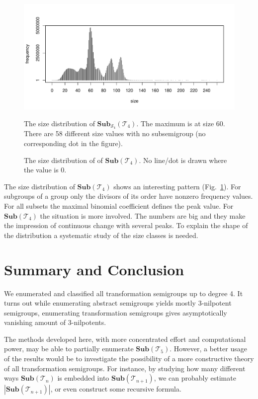\documentclass{amsart}
\newcommand{\cT}{{\mathcal T}}
\newcommand{\cS}{{\mathcal S}}
\newcommand{\Sub}{\mathbf{Sub}}
\theoremstyle{plain}
\theoremstyle{definition}
\begin{document}
\begin{figure}
\includegraphics[width=\textwidth]{SubT4distrib}
\caption{The size distribution of $\Sub_{\cS_4}(\cT_4)$. The maximum is at size 60. There are 58 different size values with no subsemigroup (no corresponding dot in the figure).}
\caption{The size distribution of of $\Sub(\cT_4)$. No line/dot is drawn where the value is 0.}
\label{fig:SubT4SizeDistrib}
\end{figure}
The size distribution of $\Sub(\cT_4)$ shows an interesting pattern (Fig.\ \ref{fig:SubT4SizeDistrib}).
For subgroups of a group only the divisors of its order have nonzero frequency values.
For all subsets the maximal binomial coefficient defines the peak value.
For $\Sub(\cT_4)$ the situation is more involved.
The numbers are big and they make the impression of continuous change with several peaks.
To explain the shape of the  distribution a systematic study of the size classes is needed. 
\section{Summary and Conclusion}
We enumerated and classified all transformation semigroups up to degree 4.
It turns out while enumerating abstract semigroups yields mostly 3-nilpotent semigroups, enumerating transformation semigroups gives asymptotically vanishing amount of 3-nilpotents.

The methods developed here, with more concentrated effort and computational power,  may be able to partially enumerate $\Sub(\cT_5)$.
However, a better usage of the results would be to investigate the possibility of a more constructive theory of all transformation semigroups.
For instance, by studying how many different ways $\Sub(\cT_n)$ is embedded into $\Sub(\cT_{n+1})$, we can probably estimate $|\Sub(\cT_{n+1})|$, or even construct some recursive formula.
\end{document}
